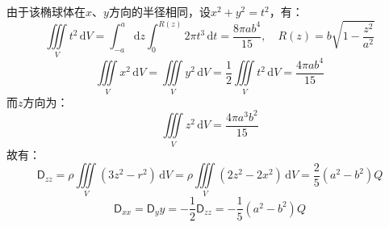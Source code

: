 \documentclass[a4paper,fontset=none]{ctexart}
\begin{document}
\begin{itemize}
        由于该椭球体在$x$、$y$方向的半径相同，设$x^2+y^2=t^2$，有：
        \[
        \iiint\limits_V t^2\,\mathrm{d}V = \int_{-a}^a \mathrm{d}z \int_{0}^{R(z)} 2\pi t^3\,\mathrm{d}t = \frac{8\pi ab^4}{15},\quad R(z) = b\sqrt{1-\frac{z^2}{a^2}}
        \]
        \[
        \iiint\limits_V x^2\,\mathrm{d}V = \iiint\limits_V y^2\,\mathrm{d}V = \frac{1}{2}\iiint\limits_V t^2\,\mathrm{d}V = \frac{4\pi ab^4}{15}
        \]
        而$z$方向为：
        \[
        \iiint\limits_V z^2\,\mathrm{d}V = \frac{4\pi a^3b^2}{15}
        \]
        故有：
        \[
        \mathsf{D}_{zz} = \rho\iiint\limits_V (3z^2-r^2)\,\mathrm{d}V = \rho\iiint\limits_V (2z^2-2x^2)\,\mathrm{d}V = \frac{2}{5}(a^2-b^2)Q
        \]
        \[
        \mathsf{D}_{xx} = \mathsf{D}_yy = -\frac{1}{2}\mathsf{D}_{zz} = -\frac{1}{5}(a^2-b^2)Q
        \]

    \end{itemize}
\end{document}
